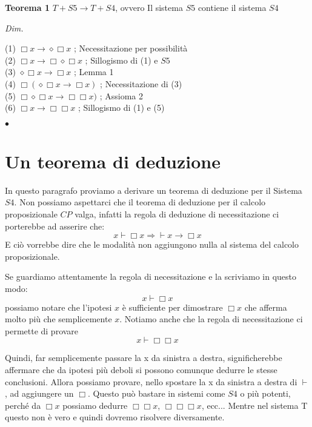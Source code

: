 \documentclass[a4paper, 12pt]{article}
\begin{document}
\begin{flushleft}
\textbf{Teorema 1}
$T + S5 \rightarrow T + S4$, ovvero Il sistema $S5$ contiene il sistema $S4$

\textit{Dim.}

(1) $\Box x \rightarrow \diamond \Box x$ ; Necessitazione per possibilità \\
(2) $\Box x \rightarrow \Box \diamond \Box x$ ; Sillogismo di (1) e $S5$ \\
(3) $\diamond \Box x \rightarrow \Box x$ ; Lemma 1 \\
(4) $\Box (\diamond \Box x \rightarrow \Box x)$ ; Necessitazione di (3) \\
(5) $\Box \diamond \Box x \rightarrow \Box \Box x)$ ; Assioma 2 \\
(6) $\Box x \rightarrow \Box \Box x$ ; Sillogismo di (1) e (5)

\begin{flushright}$\bullet$\end{flushright}
\end{flushleft}

\section{Un teorema di deduzione}
In questo paragrafo proviamo a derivare un teorema di deduzione per il Sistema $S4$.
Non possiamo aspettarci che il teorema di deduzione per il calcolo proposizionale $CP$ valga,
infatti la regola di deduzione di necessitazione ci porterebbe ad asserire che:
$$ x \vdash \Box x \Rightarrow \vdash x \rightarrow \Box x $$
E ciò vorrebbe dire che le modalità non aggiungono nulla al sistema del calcolo proposizionale.

Se guardiamo attentamente la regola di necessitazione e la scriviamo in questo modo:
$$x \vdash \Box x$$
possiamo notare che l'ipotesi $x$ è sufficiente per dimostrare $\Box x$ che afferma molto più
che semplicemente $x$.
Notiamo anche che la regola di necessitazione ci permette di provare
$$x \vdash \Box \Box x$$

Quindi, far semplicemente passare la x da sinistra a destra, significherebbe affermare che
da ipotesi più deboli si possono comunque dedurre le stesse conclusioni. Allora possiamo provare,
nello spostare la x da sinistra a destra di $\vdash$, ad aggiungere un $\Box$.
Questo può bastare in sistemi come $S4$ o più potenti, perché da $\Box x$ possiamo dedurre
$\Box \Box x$, $\Box \Box \Box x$, ecc...
Mentre nel sistema T questo non è vero e quindi dovremo risolvere diversamente.
\end{document}
